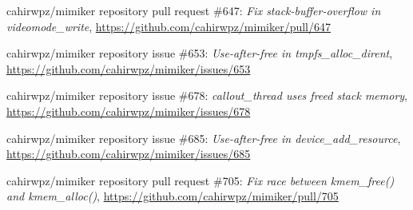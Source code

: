 \documentclass[shortabstract, manyadvisors, english, mgr]{iithesis}
\theoremstyle{definition} \newtheorem*{definition}{Definicja}
\theoremstyle{definition} \newtheorem*{example}{Przykład}
\theoremstyle{definition} \newtheorem*{remark}{Uwaga}
\begin{document}
\begin{thebibliography}{99}
cahirwpz/mimiker repository pull request \#647:
\textit{Fix stack-buffer-overflow in videomode\_write},
\url{https://github.com/cahirwpz/mimiker/pull/647}

cahirwpz/mimiker repository issue \#653:
\textit{Use-after-free in tmpfs\_alloc\_dirent},
\url{https://github.com/cahirwpz/mimiker/issues/653}

cahirwpz/mimiker repository issue \#678:
\textit{callout\_thread uses freed stack memory},
\url{https://github.com/cahirwpz/mimiker/issues/678}

cahirwpz/mimiker repository issue \#685:
\textit{Use-after-free in device\_add\_resource},
\url{https://github.com/cahirwpz/mimiker/issues/685}

cahirwpz/mimiker repository pull request \#705:
\textit{Fix race between kmem\_free() and kmem\_alloc()},
\url{https://github.com/cahirwpz/mimiker/pull/705}

\end{thebibliography}
\end{document}
